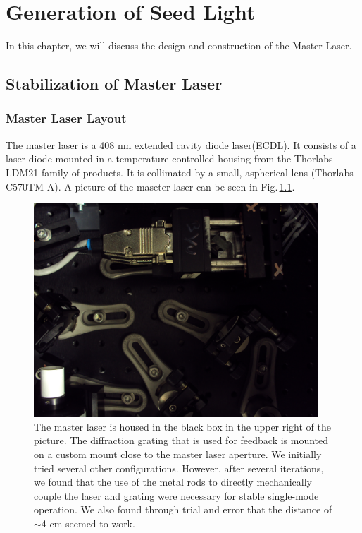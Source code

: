 \chapter{Generation of Seed Light}\label{generationOfSeedLight}

In this chapter, we will discuss the design and construction of the Master Laser. 

\section{Stabilization of Master Laser}
\subsection{Master Laser Layout}
The master laser is a 408 nm extended cavity diode laser(ECDL). It consists of a laser diode mounted in a temperature-controlled housing from the Thorlabs LDM21 family of products. It is collimated by a small, aspherical lens (Thorlabs C570TM-A). A picture of the maseter laser can be seen in Fig.\,\ref{master_laser_photo}.

\begin{figure}
\centerline{
\includegraphics[width=0.95\textwidth]{master_laser.JPG}}
\caption[Photograph of Master Laser]{\label{master_laser_photo} The master laser is housed in the black box in the upper right of the picture. The diffraction grating that is used for feedback is mounted on a custom mount close to the master laser aperture. We initially tried several other configurations. However, after several iterations, we found that the use of the metal rods to directly mechanically couple the laser and grating were necessary for stable single-mode operation. We also found through trial and error that the distance of $\sim$4 cm seemed to work. }
\end{figure}

